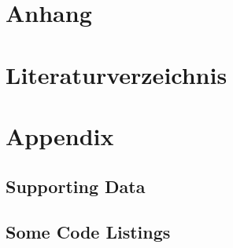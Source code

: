 \documentclass[%
thesis=student,%
coverpage=false,%
titlepage=false,%
headmarks=true, %
german,%
font=libertine, %
math=newpxtx, %
BCOR=5mm,%
coverBCOR=11mm%
]{tumbook}
\theoremstyle{break}
\begin{document}
\chapter{Anhang}
\chapter{Literaturverzeichnis}
\appendix
\chapter{Appendix}
\section{Supporting Data}
\section{Some Code Listings}

\backmatter{}
\listoffigures%
\listoftables%

\nocite{Alspach:2008,GaleShapley:1962} %
\printbibliography{} %
\end{document}
